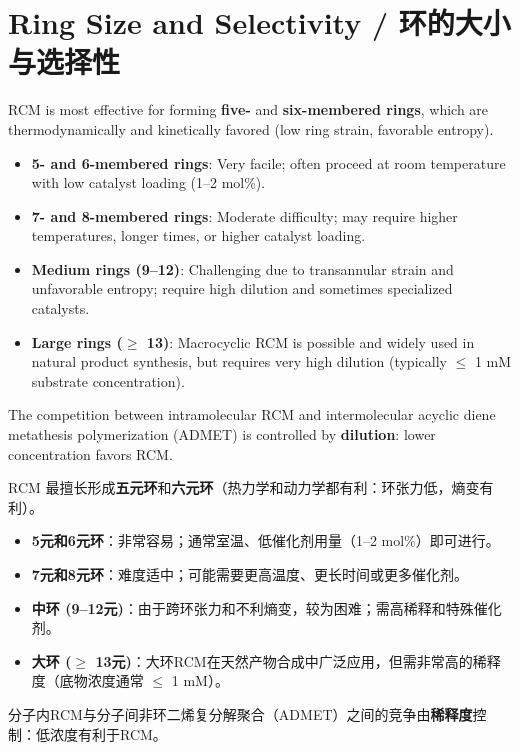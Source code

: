 \documentclass[11pt, a4paper]{article}
\begin{document}
\section{Ring Size and Selectivity / 环的大小与选择性}

\begin{enbox}[English]
RCM is most effective for forming \textbf{five-} and \textbf{six-membered rings}, which are thermodynamically and kinetically favored (low ring strain, favorable entropy).

\begin{itemize}[nosep]
  \item \textbf{5- and 6-membered rings}: Very facile; often proceed at room temperature with low catalyst loading (1--2 mol\%).
  \item \textbf{7- and 8-membered rings}: Moderate difficulty; may require higher temperatures, longer times, or higher catalyst loading.
  \item \textbf{Medium rings (9--12)}: Challenging due to transannular strain and unfavorable entropy; require high dilution and sometimes specialized catalysts.
  \item \textbf{Large rings ($\geq$ 13)}: Macrocyclic RCM is possible and widely used in natural product synthesis, but requires very high dilution (typically $\leq$ 1 mM substrate concentration).
\end{itemize}

The competition between intramolecular RCM and intermolecular acyclic diene metathesis polymerization (ADMET) is controlled by \textbf{dilution}: lower concentration favors RCM.
\end{enbox}

\begin{cnbox}[中文]
RCM 最擅长形成\textbf{五元环}和\textbf{六元环}（热力学和动力学都有利：环张力低，熵变有利）。

\begin{itemize}[nosep]
  \item \textbf{5元和6元环}：非常容易；通常室温、低催化剂用量（1--2 mol\%）即可进行。
  \item \textbf{7元和8元环}：难度适中；可能需要更高温度、更长时间或更多催化剂。
  \item \textbf{中环 (9--12元)}：由于跨环张力和不利熵变，较为困难；需高稀释和特殊催化剂。
  \item \textbf{大环 ($\geq$ 13元)}：大环RCM在天然产物合成中广泛应用，但需非常高的稀释度（底物浓度通常 $\leq$ 1 mM）。
\end{itemize}

分子内RCM与分子间非环二烯复分解聚合（ADMET）之间的竞争由\textbf{稀释度}控制：低浓度有利于RCM。
\end{cnbox}
\end{document}
